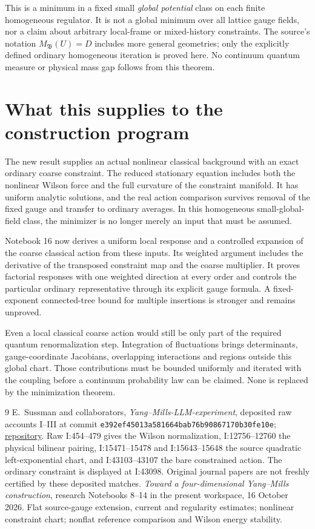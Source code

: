 \documentclass[11pt]{article}
\theoremstyle{remark}
\begin{document}
This is a minimum in a fixed small \emph{global potential}
class on each finite homogeneous regulator. It is not a
global minimum over all lattice gauge fields, nor a claim
about arbitrary local-frame or mixed-history constraints.
The source's notation $M_{\mathfrak B}(U)=D$ includes more
general geometries; only the explicitly defined ordinary
homogeneous iteration is proved here. No continuum quantum
measure or physical mass gap follows from this theorem.


\section{What this supplies to the construction program}
\label{nm15-ledger}

The new result supplies an actual nonlinear classical background
with an exact ordinary coarse constraint. The reduced stationary
equation includes both the nonlinear Wilson force and the full
curvature of the constraint manifold. It has uniform analytic
solutions, and the real action comparison survives removal of
the fixed gauge and transfer to ordinary averages. In this
homogeneous small-global-field class, the minimizer is no longer
merely an input that must be assumed.

Notebook 16 now derives a uniform local response and a controlled
expansion of the coarse classical action from these inputs.
Its weighted argument includes the derivative of the transposed
constraint map and the coarse multiplier. It proves factorial
responses with one weighted direction at every order and controls
the particular ordinary representative through its explicit gauge
formula. A fixed-exponent connected-tree bound for multiple
insertions is stronger and remains unproved.

Even a local classical coarse action would still be only part
of the required quantum renormalization step. Integration of
fluctuations brings determinants, gauge-coordinate Jacobians,
overlapping interactions and regions outside this global chart.
Those contributions must be bounded uniformly and iterated
with the coupling before a continuum probability law can be
claimed. None is replaced by the minimization theorem.

\begin{thebibliography}{9}
E.~Sussman and collaborators, \emph{Yang--Mills-LLM-experiment},
deposited raw accounts I--III at commit
\texttt{e392ef4501\allowbreak 3a581664ba\allowbreak b76b908671\allowbreak 70b30fe10e};
\href{https://github.com/ethanwsussman/Yang--Mills-LLM-experiment}{repository}.
Raw I:454--479 gives the Wilson normalization,
I:12756--12760 the physical bilinear pairing,
I:15471--15478 and I:15643--15648 the source quadratic
left-exponential chart, and I:43103--43107 the bare
constrained action. The ordinary constraint is displayed
at I:43098. Original journal papers are not freshly
certified by these deposited matches.
\emph{Toward a four-dimensional Yang--Mills construction},
research Notebooks 8--14 in the present workspace,
16 October 2026. Flat source-gauge extension, current and
regularity estimates; nonlinear constraint chart; nonflat
reference comparison and Wilson energy stability.
\end{thebibliography}
\end{document}
